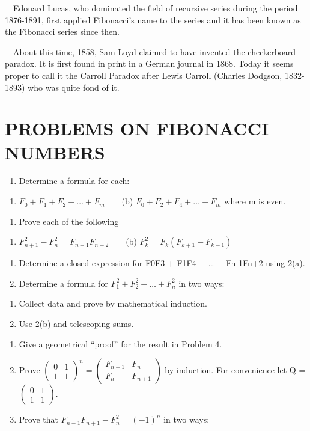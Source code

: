 \documentclass{article}
\begin{document}
\ \ Edouard Lucas, who dominated the field of recursive series during the period 1876-1891, first applied Fibonacci’s
name to the series and it has been known as the Fibonacci series since then. 

\ \ About this time, 1858, Sam Loyd claimed to have invented the checkerboard paradox. It is first found in print in a
German journal in 1868. Today it seems proper to call it the Carroll Paradox after Lewis Carroll (Charles Dodgson,
1832-1893) who was quite fond of it.

\section[PROBLEMS ON FIBONACCI NUMBERS]{PROBLEMS ON FIBONACCI NUMBERS}
\begin{enumerate}
\item Determine a formula for each:
\end{enumerate}
\begin{enumerate}
\item  $F_0+F_1+F_2+{\dots}+F_m$\ \ \ \ (b)  $F_0+F_2+F_4+{\dots}+F_m$  where m is even.
\end{enumerate}
\begin{enumerate}
\item Prove each of the following
\end{enumerate}
\begin{enumerate}
\item  $F_{n+1}^2-F_n^2=F_{n-1}F_{n+2}$\ \ \ \ (b)  $F_k^2=F_k(F_{k+1}-F_{k-1})$
\end{enumerate}
\begin{enumerate}
\item Determine a closed expression for F0F3 + F1F4 + … + Fn-1Fn+2 using 2(a).
\item Determine a formula for  $F_1^2+F_2^2+{\dots}+F_n^2$ in two ways:
\end{enumerate}
\begin{enumerate}
\item Collect data and prove by mathematical induction.
\item Use 2(b) and telescoping sums. 
\end{enumerate}
\begin{enumerate}
\item Give a geometrical “proof” for the result in Problem 4.
\item Prove 
$\left(\begin{matrix}0&1\\1&1\end{matrix}\right)^n=\left(\begin{matrix}F_{n-1}&F_n\\F_n&F_{n+1}\end{matrix}\right)$ by
induction. For convenience let Q = $\left(\begin{matrix}0&1\\1&1\end{matrix}\right)$.
\item Prove that  $F_{n-1}F_{n+1}-F_n^2=(-1)^n$ in two ways:
\end{enumerate}
\end{document}

